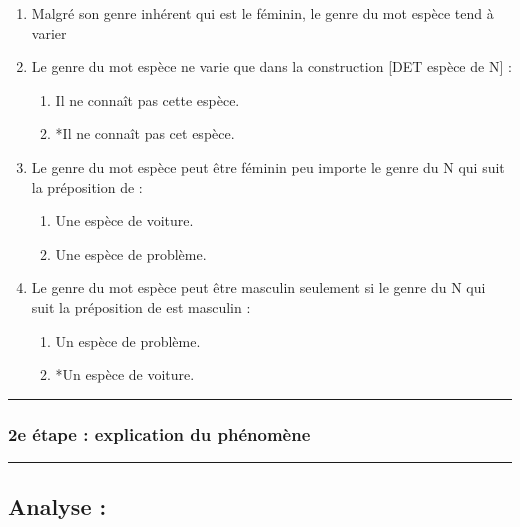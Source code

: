 \documentclass[
  letterpaper,
]{scrbook}
\begin{document}
\begin{enumerate}
\def\labelenumi{\arabic{enumi}.}
\item
  Malgré son genre inhérent qui est le féminin, le genre du mot espèce
  tend à varier
\item
  Le genre du mot espèce ne varie que dans la construction {[}DET espèce
  de N{]} :

  \begin{enumerate}
  \def\labelenumii{\arabic{enumii}.}
  \item
    Il ne connaît pas cette espèce.
  \item
    *Il ne connaît pas cet espèce.
  \end{enumerate}
\item
  Le genre du mot espèce peut être féminin peu importe le genre du N qui
  suit la préposition de :

  \begin{enumerate}
  \def\labelenumii{\arabic{enumii}.}
  \item
    Une espèce de voiture.
  \item
    Une espèce de problème.
  \end{enumerate}
\item
  Le genre du mot espèce peut être masculin seulement si le genre du N
  qui suit la préposition de est masculin :

  \begin{enumerate}
  \def\labelenumii{\arabic{enumii}.}
  \item
    Un espèce de problème.
  \item
    *Un espèce de voiture.
  \end{enumerate}
\end{enumerate}

\begin{center}\rule{0.5\linewidth}{0.5pt}\end{center}

\hypertarget{e-uxe9tape-explication-du-phuxe9nomuxe8ne}{%
\subsubsection{2e étape : explication du
phénomène}\label{e-uxe9tape-explication-du-phuxe9nomuxe8ne}}

\begin{center}\rule{0.5\linewidth}{0.5pt}\end{center}

\hypertarget{analyse}{%
\subsection{Analyse :}\label{analyse}}
\end{document}
